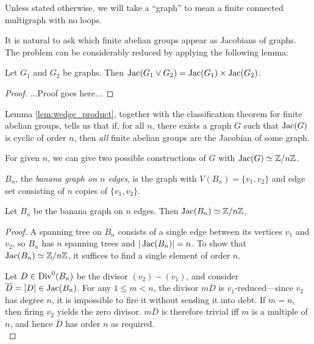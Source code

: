 \documentclass{article}
\begin{document}
Unless stated otherwise, we will take a ``graph'' to mean a finite
connected multigraph with no loops.

It is natural to ask which finite abelian groups appear as Jacobians
of graphs. The problem can be considerably reduced by applying the
following lemma:

\begin{lem}
\label{lem:wedge_product}
  Let $G_1$ and $G_2$ be graphs. Then $\operatorname{Jac}(G_1 \vee G_2) = \operatorname{Jac}(G_1)
  \times \operatorname{Jac}(G_2)$. 
\end{lem}
\begin{proof}
  ...Proof goes here...
\end{proof}

Lemma \ref{lem:wedge_product}, together with the classification
theorem for finite abelian groups, tells us that if, for all $n$,
there exists a graph $G$ such that $\operatorname{Jac}(G)$ is cyclic of order $n$,
then \emph{all} finite abelian groups are the Jacobian of some graph.

For given $n$, we can give two possible constructions of $G$ with
$\operatorname{Jac}(G) \simeq \mathbb{Z}/n\mathbb{Z}$.

\begin{defn}
  $B_n$, the \emph{banana graph on $n$ edges}, is the graph with
  $V(B_n) = \{v_1, v_2\}$ and edge set consisting of $n$ copies of
  $\{v_1, v_2\}$.
\end{defn}

\begin{prop}
  \label{prop:banana_cyclic}
  Let $B_n$ be the banana graph on $n$ edges. Then $\operatorname{Jac}(B_n) \simeq \mathbb{Z}/n\mathbb{Z}$.
\end{prop}

\begin{proof}
  A spanning tree on $B_n$ consists of a single edge between its
  vertices $v_1$ and $v_2$, so $B_n$ has $n$ spanning trees and
  $|\operatorname{Jac}(B_n)| = n$. To show that $\operatorname{Jac}(B_n) \simeq \mathbb{Z}/n\mathbb{Z}$, it
  suffices to find a single element of order $n$.

  Let $D \in \operatorname{Div}^0(B_n)$ be the divisor $(v_2) - (v_1)$, and consider
  $\overline{D} = [D] \in \operatorname{Jac}(B_n)$. For any $1 \le m < n$, the
  divisor $mD$ is $v_1$-reduced---since $v_2$ has degree $n$, it is
  impossible to fire it without sending it into debt. If $m=n$, then
  firing $v_2$ yields the zero divisor. $m\overline{D}$ is therefore
  trivial iff $m$ is a multiple of $n$, and hence $\overline{D}$ has
  order $n$ as required.\\
\end{proof}
\end{document}
